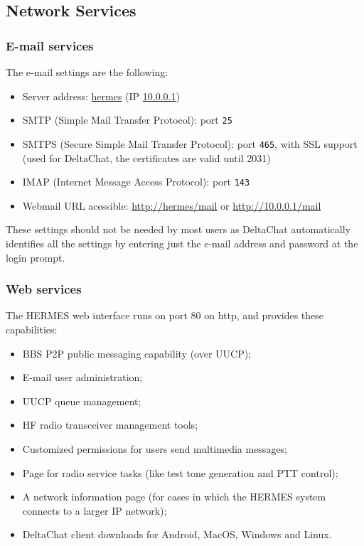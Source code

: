 \documentclass[11pt,a4paper]{article}
\begin{document}
\subsection{Network Services} 
\label{apx_net_services}

\subsubsection{E-mail services}
\label{apx_net_email}

The e-mail settings are the following:

\begin{itemize}
    \item Server address: \url{hermes} (IP \url{10.0.0.1})
    \item SMTP (Simple Mail Transfer Protocol): port \texttt{25}
    \item SMTPS (Secure Simple Mail Transfer Protocol): port \texttt{465}, with SSL support 
    (used for DeltaChat, the certificates are valid until 2031)
    \item IMAP (Internet Message Access Protocol): port \texttt{143}
    \item Webmail URL acessible: \url{http://hermes/mail} or \url{http://10.0.0.1/mail}
\end{itemize}

These settings should not be needed by most users as DeltaChat automatically identifies all the settings by entering just the e-mail address and password at the login prompt.

\subsubsection{Web services}
\label{apx_net_web}

The HERMES web interface runs on port 80 on http, and provides these capabilities:
\begin{itemize}
    \item BBS P2P public messaging capability (over UUCP);
    \item E-mail user administration;
    \item UUCP queue management;
    \item HF radio transceiver management tools;
    \item Customized permissions for users send multimedia messages;
    \item Page for radio service tasks (like test tone generation and PTT control);
    \item A network information page (for cases in which the HERMES system connects to a larger IP network);
    \item DeltaChat client downloads for Android, MacOS, Windows and Linux.
\end{itemize}
\end{document}

